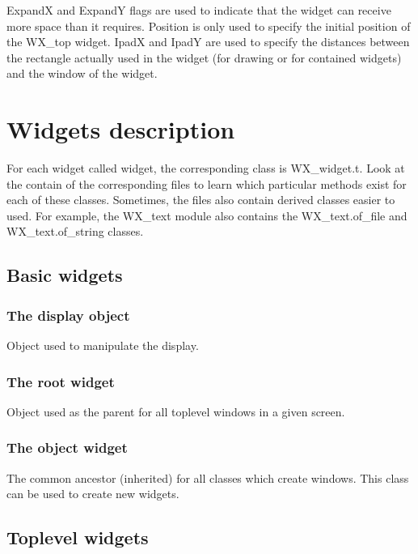 \documentclass{report}
\begin{document}
 {\sf ExpandX} and {\sf ExpandY} flags are used to indicate that the widget
can receive more space than it requires. {\sf Position} is only used to
specify the initial position of the {\sf WX\_top} widget. {\sf IpadX} and {
\sf IpadY} are used to specify the distances between the rectangle actually
used in the widget (for drawing or for contained widgets) and the window 
of the widget.

\chapter{Widgets description}

For each widget called {\sf widget}, the corresponding class is {\sf 
WX\_widget.t}. Look at the contain of the corresponding files to learn 
which particular methods exist for each of these classes. Sometimes, the 
files also contain derived classes easier to used. For example, the {\sf 
WX\_text} module also contains the {\sf WX\_text.of\_file} and {\sf 
WX\_text.of\_string} classes.

\section{Basic widgets}

\subsection{The {\sf display} object}

Object used to manipulate the display.

\subsection{The {\sf root} widget}

Object used as the parent for all toplevel windows in a given screen.

\subsection{The {\sf object} widget}

The common ancestor (inherited) for all classes which create windows.
This class can be used to create new widgets.

\section{Toplevel widgets}
\end{document}
